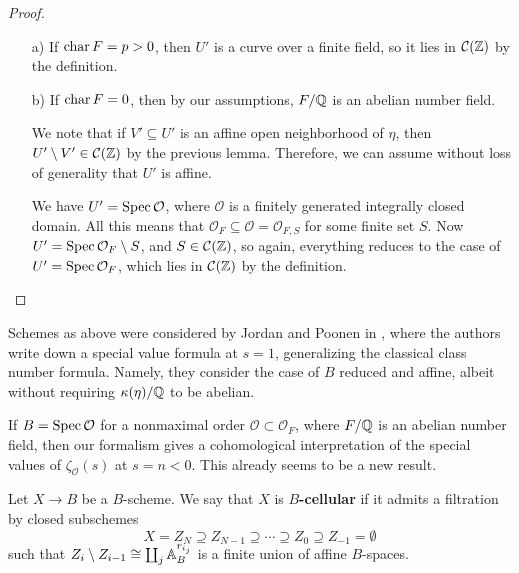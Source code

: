 \documentclass{article}
\numberwithin{equation}{section}
\begin{document}
\begin{proposition}
\begin{proof}
    \begin{enumerate}
    \item[a)] If $\fchar F = p > 0$, then $U'$ is a curve over a finite field,
      so it lies in $\mathcal{C} (\ZZ)$ by the definition.

    \item[b)] If $\fchar F = 0$, then by our assumptions, $F/\QQ$ is an abelian
      number field.

      We note that if $V' \subseteq U'$ is an affine open neighborhood of
      $\eta$, then $U'\setminus V' \in \mathcal{C} (\ZZ)$ by the previous
      lemma. Therefore, we can assume without loss of generality that $U'$ is
      affine.

      We have $U' = \Spec \mathcal{O}$, where $\mathcal{O}$ is a finitely
      generated integrally closed domain. All this means that
      $\mathcal{O}_F \subseteq \mathcal{O} = \mathcal{O}_{F,S}$ for some finite
      set $S$. Now $U' = \Spec \mathcal{O}_F \setminus S$, and
      $S \in \mathcal{C} (\ZZ)$, so again, everything reduces to the case of
      $U' = \Spec \mathcal{O}_F$, which lies in $\mathcal{C} (\ZZ)$ by the
      definition. \qedhere
    \end{enumerate}
  \end{proof}
\end{proposition}

\begin{remark}
  Schemes as above were considered by Jordan and Poonen in
  \cite{Jordan-Poonen-2020}, where the authors write down a special value
  formula at $s = 1$, generalizing the classical class number formula. Namely,
  they consider the case of $B$ reduced and affine, albeit without requiring
  $\kappa (\eta)/\QQ$ to be abelian.
\end{remark}

\begin{example}
  If $B = \Spec \mathcal{O}$ for a nonmaximal order
  $\mathcal{O} \subset \mathcal{O}_F$, where $F/\QQ$ is an abelian number field,
  then our formalism gives a cohomological interpretation of the special values
  of $\zeta_\mathcal{O} (s)$ at $s = n < 0$. This already seems to be a new
  result.
\end{example}

\begin{definition}
  \label{dfn:B-cellular-scheme}
  Let $X \to B$ be a $B$-scheme. We say that $X$ is \textbf{$B$-cellular} if it
  admits a filtration by closed subschemes
  \begin{equation}
    \label{eqn:cellular-decomposition}
    X = Z_N \supseteq Z_{N-1} \supseteq \cdots \supseteq Z_0 \supseteq Z_{-1} = \emptyset
  \end{equation}
  such that $Z_i\setminus Z_{i-1} \cong \coprod_j \AA^{r_{i_j}}_B$ is a finite
  union of affine $B$-spaces.
\end{definition}
\end{document}
